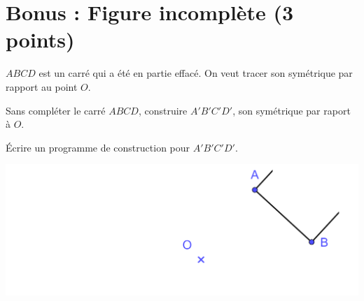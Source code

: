 \section{Bonus : Figure incomplète (3 points) }

$ABCD$ est un carré qui a été en partie effacé. On veut tracer son symétrique par rapport au point $O$.

\begin{questions}
	\question[1] Sans compléter le carré $ABCD$, construire $A'B'C'D'$, son symétrique par raport à $O$.
	
	\question[2] \'Ecrire un programme de construction pour $A'B'C'D'$.
\end{questions}

\begin{center}
	\includegraphics[scale=0.3]{img/carre}
\end{center}